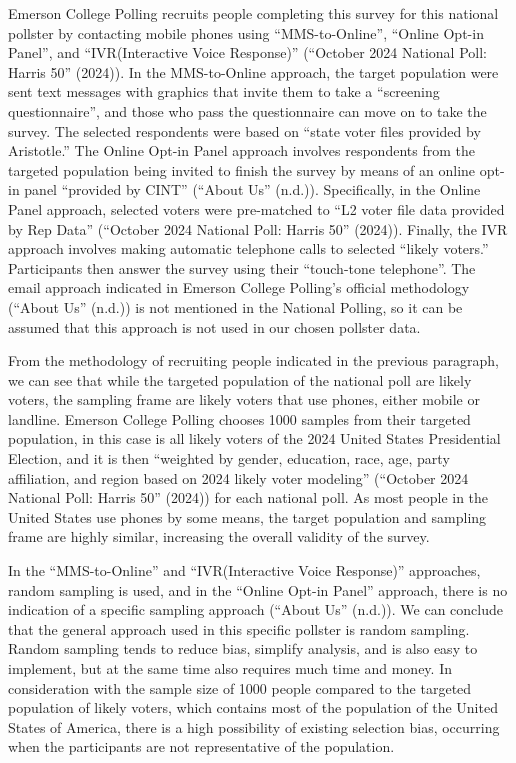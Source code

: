 \documentclass[
  letterpaper,
  DIV=11,
  numbers=noendperiod]{scrartcl}
\begin{document}
Emerson College Polling recruits people completing this survey for this
national pollster by contacting mobile phones using ``MMS-to-Online'',
``Online Opt-in Panel'', and ``IVR(Interactive Voice Response)''
({``October 2024 National Poll: Harris 50''} (2024)). In the
MMS-to-Online approach, the target population were sent text messages
with graphics that invite them to take a ``screening questionnaire'',
and those who pass the questionnaire can move on to take the survey. The
selected respondents were based on ``state voter files provided by
Aristotle.'' The Online Opt-in Panel approach involves respondents from
the targeted population being invited to finish the survey by means of
an online opt-in panel ``provided by CINT'' ({``About Us''} (n.d.)).
Specifically, in the Online Panel approach, selected voters were
pre-matched to ``L2 voter file data provided by Rep Data'' ({``October
2024 National Poll: Harris 50''} (2024)). Finally, the IVR approach
involves making automatic telephone calls to selected ``likely voters.''
Participants then answer the survey using their ``touch-tone
telephone''. The email approach indicated in Emerson College Polling's
official methodology ({``About Us''} (n.d.)) is not mentioned in the
National Polling, so it can be assumed that this approach is not used in
our chosen pollster data.

From the methodology of recruiting people indicated in the previous
paragraph, we can see that while the targeted population of the national
poll are likely voters, the sampling frame are likely voters that use
phones, either mobile or landline. Emerson College Polling chooses 1000
samples from their targeted population, in this case is all likely
voters of the 2024 United States Presidential Election, and it is then
``weighted by gender, education, race, age, party affiliation, and
region based on 2024 likely voter modeling'' ({``October 2024 National
Poll: Harris 50''} (2024)) for each national poll. As most people in the
United States use phones by some means, the target population and
sampling frame are highly similar, increasing the overall validity of
the survey.

In the ``MMS-to-Online'' and ``IVR(Interactive Voice Response)''
approaches, random sampling is used, and in the ``Online Opt-in Panel''
approach, there is no indication of a specific sampling approach
({``About Us''} (n.d.)). We can conclude that the general approach used
in this specific pollster is random sampling. Random sampling tends to
reduce bias, simplify analysis, and is also easy to implement, but at
the same time also requires much time and money. In consideration with
the sample size of 1000 people compared to the targeted population of
likely voters, which contains most of the population of the United
States of America, there is a high possibility of existing selection
bias, occurring when the participants are not representative of the
population.
\end{document}
